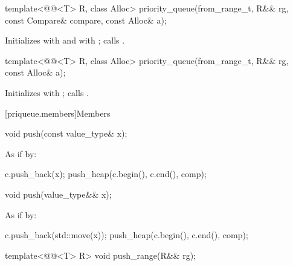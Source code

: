 %
\begin{itemdecl}
template<@@<T> R, class Alloc>
  priority_queue(from_range_t, R&& rg, const Compare& compare, const Alloc& a);
\end{itemdecl}

\begin{itemdescr}
\pnum
\effects
Initializes  with  and
 with ;
calls .
\end{itemdescr}

%
\begin{itemdecl}
template<@@<T> R, class Alloc>
  priority_queue(from_range_t, R&& rg, const Alloc& a);
\end{itemdecl}

\begin{itemdescr}
\pnum
\effects
Initializes
 with ;
calls .
\end{itemdescr}

[priqueue.members]{Members}

%
\begin{itemdecl}
void push(const value_type& x);
\end{itemdecl}

\begin{itemdescr}
\pnum
\effects
As if by:
\begin{codeblock}
c.push_back(x);
push_heap(c.begin(), c.end(), comp);
\end{codeblock}
\end{itemdescr}

%
\begin{itemdecl}
void push(value_type&& x);
\end{itemdecl}

\begin{itemdescr}
\pnum
\effects
As if by:
\begin{codeblock}
c.push_back(std::move(x));
push_heap(c.begin(), c.end(), comp);
\end{codeblock}
\end{itemdescr}

%
\begin{itemdecl}
template<@@<T> R>
  void push_range(R&& rg);
\end{itemdecl}

